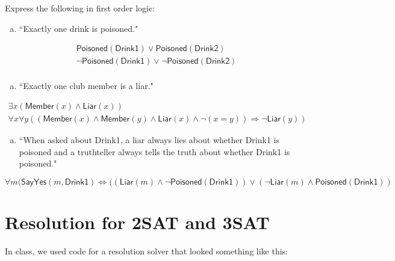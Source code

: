\documentclass{article}
\begin{document}
\noindent Express the following in first order logic:

\begin{enumerate}[(a)]
\item ``Exactly one drink is poisoned."
\end{enumerate}

\begin{gather*}
\mathsf{Poisoned}(\mathsf{Drink1}) \lor \mathsf{Poisoned}(\mathsf{Drink2}) \\
\lnot \mathsf{Poisoned}(\mathsf{Drink1}) \lor \lnot \mathsf{Poisoned}(\mathsf{Drink2}) \\
\end{gather*}

\begin{enumerate}[(b)]
\item ``Exactly one club member is a liar."
\end{enumerate}

\begin{gather*}
\exists x (\mathsf{Member}(x) \land \mathsf{Liar}(x) )\\
\forall x \forall y ((\mathsf{Member}(x) \land \mathsf{Member}(y) \land \mathsf{Liar}(x) \land \lnot (x=y)) \Rightarrow \lnot \mathsf{Liar}(y) )
\end{gather*}


\begin{enumerate}[(c)]
\item ``When asked about Drink1, a liar always lies about whether Drink1 is poisoned and a truthteller always tells the truth about whether Drink1 is poisoned."
\end{enumerate}


$\forall m (\mathsf{SayYes}(m, \mathsf{Drink1}) \Leftrightarrow ((\mathsf{Liar}(m) \land \lnot \mathsf{Poisoned}(\mathsf{Drink1})) \lor (\lnot \mathsf{Liar}(m) \land \mathsf{Poisoned}(\mathsf{Drink1})) $


\section{Resolution for 2SAT and 3SAT}

In class, we used code for a resolution solver that looked something like this:
\end{document}
